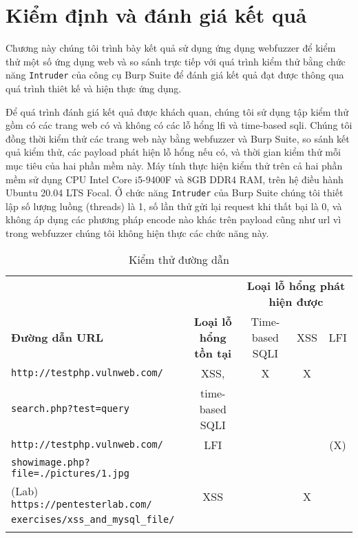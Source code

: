 \chapter{Kiểm định và đánh giá kết quả}
Chương này chúng tôi trình bày kết quả sử dụng ứng dụng webfuzzer để kiểm thử một số ứng dụng web và so sánh trực tiếp với quá trình kiểm thử bằng chức năng \texttt{Intruder} của công cụ Burp Suite để đánh giá kết quả đạt được thông qua quá trình thiêt kế và hiện thực ứng dụng.\par
Để quá trình đánh giá kết quả được khách quan, chúng tôi sử dụng tập kiểm thử gồm có các trang web có và không có các lỗ hổng \acrshort{lfi} và time-based \acrshort{sqli}. Chúng tôi đồng thời kiểm thử các trang web này bằng webfuzzer và Burp Suite, so sánh kết quả kiểm thử, các payload phát hiện lỗ hổng nếu có, và thời gian kiểm thử mỗi mục tiêu của hai phần mềm này. Máy tính thực hiện kiểm thử trên cả hai phần mềm sử dụng CPU Intel Core i5-9400F và 8GB DDR4 RAM, trên hệ điều hành Ubuntu 20.04 LTS Focal. Ở chức năng \texttt{Intruder} của Burp Suite chúng tôi thiết lập số lượng luồng (threads) là 1, số lần thử gửi lại request khi thất bại là 0, và không áp dụng các phương pháp encode nào khác trên payload cũng như \acrshort{url} vì trong webfuzzer chúng tôi không hiện thực các chức năng này.\par
\FloatBarrier
\begin{table}[ht]
    \centering
    \caption{Kiểm thử đường dẫn }
    \label{tab:testing-results}
    \begin{tabular}[ht]{lcccc}
        \toprule[1pt]\midrule[0.3pt]
            &{}&\multicolumn{3}{c}{\textbf{Loại lỗ hổng phát hiện được}}\\ \cmidrule{3-5}\textbf{Đường dẫn URL} &\textbf{Loại lỗ hổng tồn tại}&Time-based SQLI&XSS&LFI\\ 
        \midrule
            \texttt{http://testphp.vulnweb.com/}&XSS,&X&X& \\
            \texttt{search.php?test=query}&time-based SQLI& & & \\
            \addlinespace
            \texttt{http://testphp.vulnweb.com/}&LFI& & &(X)\\
            \texttt{showimage.php?file=./pictures/1.jpg}& & & & \\
            \addlinespace
            (Lab) \texttt{https://pentesterlab.com/}&XSS&&X& \\
            \texttt{exercises/xss\_and\_mysql\_file/}& & & & \\
            \addlinespace
        \midrule[0.3pt]\bottomrule[1pt]
    \end{tabular}
\end{table}
\FloatBarrier
